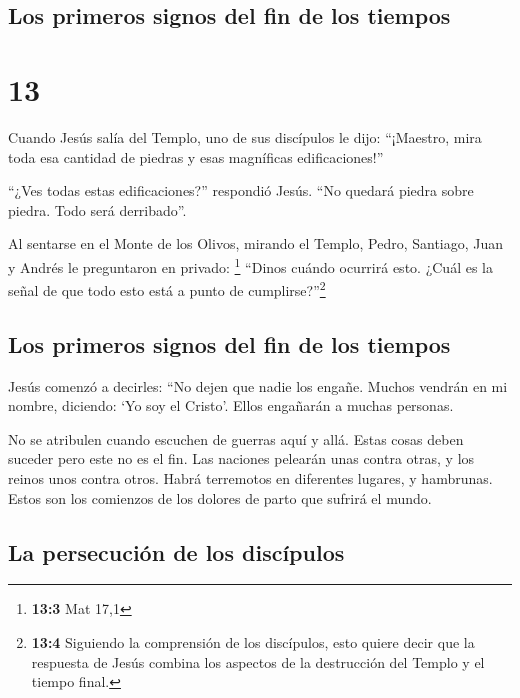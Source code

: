 \hypertarget{los-primeros-signos-del-fin-de-los-tiempos}{%
\subsection{Los primeros signos del fin de los
tiempos}\label{los-primeros-signos-del-fin-de-los-tiempos}}

\hypertarget{section-12}{%
\section{13}\label{section-12}}

 Cuando Jesús salía del Templo, uno de sus discípulos le
dijo: ``¡Maestro, mira toda esa cantidad de piedras y esas magníficas
edificaciones!''

 ``¿Ves todas estas edificaciones?'' respondió Jesús. ``No
quedará piedra sobre piedra. Todo será derribado''.

 Al sentarse en el Monte de los Olivos, mirando el Templo,
Pedro, Santiago, Juan y Andrés le preguntaron en privado: \footnote{\textbf{13:3}
  Mat 17,1}  ``Dinos cuándo ocurrirá esto. ¿Cuál es la
señal de que todo esto está a punto de cumplirse?''\footnote{\textbf{13:4}
  Siguiendo la comprensión de los discípulos, esto quiere decir que la
  respuesta de Jesús combina los aspectos de la destrucción del Templo y
  el tiempo final.}

\hypertarget{los-primeros-signos-del-fin-de-los-tiempos-1}{%
\subsection{Los primeros signos del fin de los
tiempos}\label{los-primeros-signos-del-fin-de-los-tiempos-1}}

 Jesús comenzó a decirles: ``No dejen que nadie los
engañe.  Muchos vendrán en mi nombre, diciendo: `Yo soy el
Cristo'. Ellos engañarán a muchas personas.

 No se atribulen cuando escuchen de guerras aquí y allá.
Estas cosas deben suceder pero este no es el fin.  Las
naciones pelearán unas contra otras, y los reinos unos contra otros.
Habrá terremotos en diferentes lugares, y hambrunas. Estos son los
comienzos de los dolores de parto que sufrirá el mundo.

\hypertarget{la-persecuciuxf3n-de-los-discuxedpulos}{%
\subsection{La persecución de los
discípulos}\label{la-persecuciuxf3n-de-los-discuxedpulos}}

